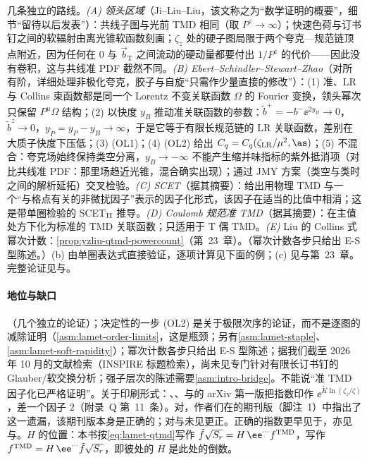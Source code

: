 \begin{proofsketch}
几条独立的路线。\emph{(A) 领头区域}（Ji--Liu--Liu\cite{Ji:2019ewn}，该文称之为“数学证明的概要”，细节“留待以后发表”）：共线子图与光前 TMD 相同（取 $P^z\to\infty$）；快速色荷与订书钉之间的软辐射由离光锥软函数刻画；$\zeta_z$ 处的硬子图局限于两个夸克—规范链顶点附近，因为任何在 $0$ 与 $\vec b_{\mathrm T}$ 之间流动的硬动量都要付出 $1/P^z$ 的代价——因此没有卷积，这与共线准 PDF 截然不同。\emph{(B) Ebert--Schindler--Stewart--Zhao}\cite{Ebert:2022fmh}（对所有阶，详细处理非极化夸克，胶子与自旋“只需作少量直接的修改”）：(1) 准、LR 与 Collins 束函数都是同一个 Lorentz 不变关联函数 $\Omega$ 的 Fourier 变换，领头幂次只保留 $P^\mu\Omega$ 结构；(2) 以快度 $y_B$ 推动准关联函数的参数：$\tilde b^+=-b^-\ee^{2y_B}\to0$，$\tilde b^z\to0$，$y_{\tilde P}=y_P-y_B\to\infty$，于是它等于有限长规范链的 LR 关联函数，差别在大质子快度下压低；(3) (OL1)；(4) (OL2) 给出 $C_q=C_q(\zeta_{\rm LR}/\mu^2,\as)$；(5) 不混合：夸克场始终保持类空分离，$y_B\to-\infty$ 不能产生缩并味指标的紫外抵消项（对比共线准 PDF：那里场趋近光锥，混合确实出现）；通过 JMY 方案（类空与类时之间的解析延拓）交叉检验。\emph{(C) SCET}\cite{Vladimirov:2020ofp}（据其摘要）：给出用物理 TMD 与一个“与格点有关的非微扰因子”表示的因子化形式，该因子在适当的比值中相消；这是带单圈检验的 SCET$_{\rm II}$ 推导。\emph{(D) Coulomb 规范准 TMD}\cite{Zhao:2023ptv}（据其摘要）：在主值处方下化为标准的 TMD 关联函数；只适用于 T 偶 TMD。\emph{(E)} Liu 的 Collins 式幂次计数：\cref{prop:yzliu-qtmd-powercount}（第~23~章）。（幂次计数各步只给出 E-S 型陈述。）(b) 由单圈表达式直接验证，逐项计算见下面的例；(c) 见\cite{delRio:2023pse}与第~23~章。完整论证见\cite{Ji:2019ewn}与\cite{Ebert:2022fmh}。
\end{proofsketch}

\paragraph{地位与缺口}
\tagA（几个独立的论证）；决定性的一步 (OL2) 是关于极限次序的论证，而不是逐图的减除证明（\cref{asm:lamet-order-limits}，这是瓶颈；另有\cref{asm:lamet-staple}、\cref{asm:lamet-soft-rapidity}）；幂次计数各步只给出 E-S 型陈述；据我们截至 2026 年 10 月的文献检索（INSPIRE 标题检索），尚未见专门针对有限长订书钉的 Glauber/软交换分析；强子层次的陈述需要\cref{asm:intro-bridge}。不能说“准 TMD 因子化已严格证明”。关于印刷形式：\cite[式~(22)]{Ji:2019ewn}、\cite[式~(209)--(210)]{JiEtAl2021}、\cite[式~(53)、(75)]{Liu:2022nnk}与\cite{Ji:2021znw}的 arXiv 第一版把指数印作 $\ee^{\tilde K\ln(\zeta_z/\zeta)}$，差一个因子 $2$（附录~Q 第~11~条）。对\cite{JiEtAl2021}，作者们在\cite{Ji:2021znw}的期刊版（脚注~1）中指出了这一遗漏，该期刊版本身是正确的；对\cite[式~(22)]{Ji:2019ewn}与\cite[式~(53)、(75)]{Liu:2022nnk}未见更正。正确的指数更早见于\cite[式~(24)、(27)]{EbertStewartZhao2019}，亦见\cite{Ebert:2022fmh}与\cite[式~(52)]{Liu:2022nnk}。$H$ 的位置：本书按\cref{eq:lamet-qtmd}写作 $\tilde f\sqrt{S_r}=H\,\ee^{\cdots}f^{\rm TMD}$，\cite[式~(209)]{JiEtAl2021}写作 $f^{\rm TMD}=H\,\ee^{\cdots}\tilde f\sqrt{S_r}$，即彼处的 $H$ 是此处的倒数。

